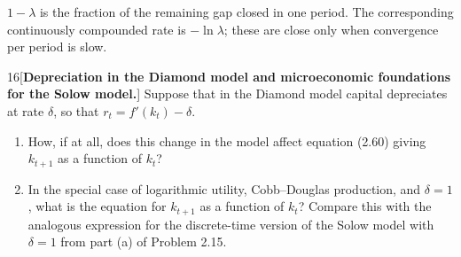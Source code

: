 \begin{note}
    \(1-\lambda\) is the fraction of the remaining gap closed in one
    period. The corresponding continuously compounded rate is
    \(-\ln\lambda\); these are close only when convergence per period is
    slow.
\end{note}

\begin{problem}{16}[\textbf{Depreciation in the Diamond model and microeconomic foundations for the Solow model.}]
Suppose that in the Diamond model capital depreciates at rate \(\delta\), so that \(r_t=f'\left(k_t\right)-\delta\).
\begin{enumerate}[label=(\alph*)]
    \item How, if at all, does this change in the model affect equation (2.60) giving \(k_{t+1}\) as a function of \(k_t\)?
    \item In the special case of logarithmic utility, Cobb--Douglas production, and \(\delta=1\), what is the equation for \(k_{t+1}\) as a function of \(k_t\)? Compare this with the analogous expression for the discrete-time version of the Solow model with \(\delta=1\) from part (a) of Problem 2.15.
\end{enumerate}
\end{problem}

